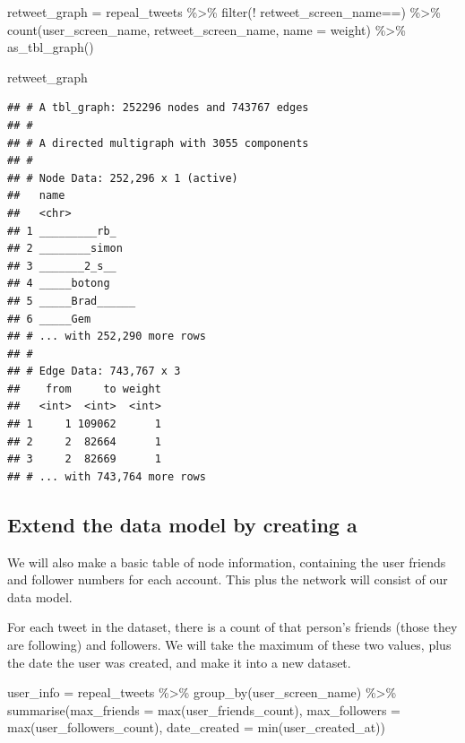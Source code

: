 \documentclass[
]{book}
\newenvironment{Shaded}{\begin{snugshade}}{\end{snugshade}}
\newcommand{\AttributeTok}[1]{\textcolor[rgb]{0.77,0.63,0.00}{#1}}
\newcommand{\FunctionTok}[1]{\textcolor[rgb]{0.00,0.00,0.00}{#1}}
\newcommand{\NormalTok}[1]{#1}
\newcommand{\OtherTok}[1]{\textcolor[rgb]{0.56,0.35,0.01}{#1}}
\newcommand{\SpecialCharTok}[1]{\textcolor[rgb]{0.00,0.00,0.00}{#1}}
\newcommand{\StringTok}[1]{\textcolor[rgb]{0.31,0.60,0.02}{#1}}
\begin{document}
\begin{Shaded}
\begin{Highlighting}[]
\NormalTok{retweet\_graph }\OtherTok{=}\NormalTok{ repeal\_tweets }\SpecialCharTok{\%\textgreater{}\%} 
  \FunctionTok{filter}\NormalTok{(}\SpecialCharTok{!}\NormalTok{ retweet\_screen\_name}\SpecialCharTok{==}\StringTok{\textquotesingle{}\textquotesingle{}}\NormalTok{) }\SpecialCharTok{\%\textgreater{}\%} 
  \FunctionTok{count}\NormalTok{(user\_screen\_name, retweet\_screen\_name, }\AttributeTok{name =} \StringTok{\textquotesingle{}weight\textquotesingle{}}\NormalTok{) }\SpecialCharTok{\%\textgreater{}\%} 
  \FunctionTok{as\_tbl\_graph}\NormalTok{() }

\NormalTok{retweet\_graph}
\end{Highlighting}
\end{Shaded}

\begin{verbatim}
## # A tbl_graph: 252296 nodes and 743767 edges
## #
## # A directed multigraph with 3055 components
## #
## # Node Data: 252,296 x 1 (active)
##   name           
##   <chr>          
## 1 _________rb_   
## 2 ________simon  
## 3 _______2_s__   
## 4 _____botong    
## 5 _____Brad______
## 6 _____Gem       
## # ... with 252,290 more rows
## #
## # Edge Data: 743,767 x 3
##    from     to weight
##   <int>  <int>  <int>
## 1     1 109062      1
## 2     2  82664      1
## 3     2  82669      1
## # ... with 743,764 more rows
\end{verbatim}

\hypertarget{extend-the-data-model-by-creating-a}{%
\subsection{Extend the data model by creating a}\label{extend-the-data-model-by-creating-a}}

We will also make a basic table of node information, containing the user friends and follower numbers for each account. This plus the network will consist of our data model.

For each tweet in the dataset, there is a count of that person's friends (those they are following) and followers. We will take the maximum of these two values, plus the date the user was created, and make it into a new dataset.

\begin{Shaded}
\begin{Highlighting}[]
\NormalTok{user\_info }\OtherTok{=}\NormalTok{ repeal\_tweets }\SpecialCharTok{\%\textgreater{}\%} 
  \FunctionTok{group\_by}\NormalTok{(user\_screen\_name) }\SpecialCharTok{\%\textgreater{}\%} 
  \FunctionTok{summarise}\NormalTok{(}\AttributeTok{max\_friends =} \FunctionTok{max}\NormalTok{(user\_friends\_count), }
            \AttributeTok{max\_followers =} \FunctionTok{max}\NormalTok{(user\_followers\_count), }
            \AttributeTok{date\_created =} \FunctionTok{min}\NormalTok{(user\_created\_at))}
\end{Highlighting}
\end{Shaded}
\end{document}
